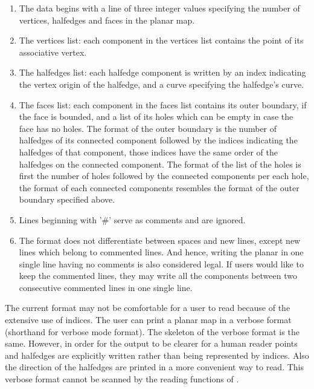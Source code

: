 \begin{ccAdvanced}
\begin{enumerate}
\item The data begins with a line of three integer values specifying the number of vertices, 
halfedges and faces in the planar map.
\item The vertices list: each component in the vertices list contains the point of its associative vertex.
\item The halfedges list: each halfedge component is written by an index indicating the vertex origin 
of the halfedge, and a curve specifying the halfedge's curve.
\item The faces list: each component in the faces list contains its outer boundary, 
if the face is bounded, and a list of its holes which can be empty in case the face 
has no holes. The format of the outer boundary is the number of halfedges of its connected 
component followed by the indices indicating the halfedges of that component, those indices 
have the same order of the halfedges on the connected component. 
The format of the list of the holes is first the number of holes followed by the connected 
components per each hole, the format of each connected components resembles the format 
of the outer boundary specified above.
\item Lines beginning with '\#' serve as comments and are ignored.
\item The format does not differentiate between spaces and new lines, 
except new lines which belong to commented lines. 
And hence, writing the planar in one single line having no comments is also considered legal. 
If users would like to keep the commented lines, they may write all the 
components between two consecutive commented lines in one single line.

\end{enumerate}

The current format may not be comfortable for a user to read because
of the extensive use of indices. The user can print a planar map in a
verbose format (shorthand for verbose mode format).  The skeleton of 
the verbose format is the same. However, in order for the output to be
clearer for a human reader points and halfedges are explicitly written
rather than being represented by indices. Also the direction of the
halfedges are printed in a more convenient way to read. This verbose
format cannot be scanned by the reading functions of
.

\ccExample


\end{ccAdvanced}
